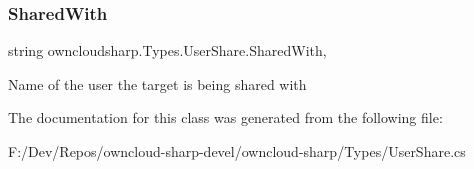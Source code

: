 \subsubsection{\texorpdfstring{Shared\+With}{SharedWith}}
{\footnotesize\ttfamily string owncloudsharp.\+Types.\+User\+Share.\+Shared\+With\hspace{0.3cm}{\ttfamily [get]}, {\ttfamily [set]}}



Name of the user the target is being shared with 



The documentation for this class was generated from the following file\+:\begin{DoxyCompactItemize}
\item 
F\+:/\+Dev/\+Repos/owncloud-\/sharp-\/devel/owncloud-\/sharp/\+Types/User\+Share.\+cs\end{DoxyCompactItemize}
